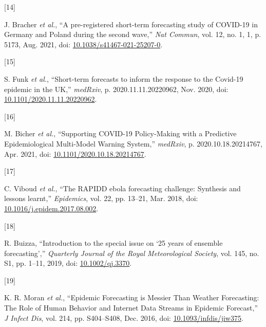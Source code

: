 \documentclass[
]{article}
\newlength{\cslhangindent}
\newlength{\csllabelwidth}
\newlength{\cslentryspacingunit} %
\newenvironment{CSLReferences}[2] %
 {%
  \setlength{\parindent}{0pt}
  \ifodd #1
  \let\oldpar\par
  \def\par{\hangindent=\cslhangindent\oldpar}
  \fi
  \setlength{\parskip}{#2\cslentryspacingunit}
 }%
 {}
\newcommand{\CSLLeftMargin}[1]{\parbox[t]{\csllabelwidth}{#1}}
\newcommand{\CSLRightInline}[1]{\parbox[t]{\linewidth - \csllabelwidth}{#1}\break}
\begin{document}
\begin{CSLReferences}{0}{0}
\leavevmode{}%
\CSLLeftMargin{{[}14{]} }
\CSLRightInline{J. Bracher \emph{et al.}, {``A pre-registered short-term forecasting study of {COVID-19} in {Germany} and {Poland} during the second wave,''} \emph{Nat Commun}, vol. 12, no. 1, 1, p. 5173, Aug. 2021, doi: \href{https://doi.org/10.1038/s41467-021-25207-0}{10.1038/s41467-021-25207-0}.}

\leavevmode{}%
\CSLLeftMargin{{[}15{]} }
\CSLRightInline{S. Funk \emph{et al.}, {``Short-term forecasts to inform the response to the {Covid-19} epidemic in the {UK},''} \emph{medRxiv}, p. 2020.11.11.20220962, Nov. 2020, doi: \href{https://doi.org/10.1101/2020.11.11.20220962}{10.1101/2020.11.11.20220962}.}

\leavevmode{}%
\CSLLeftMargin{{[}16{]} }
\CSLRightInline{M. Bicher \emph{et al.}, {``Supporting {COVID-19 Policy-Making} with a {Predictive Epidemiological Multi-Model Warning System},''} \emph{medRxiv}, p. 2020.10.18.20214767, Apr. 2021, doi: \href{https://doi.org/10.1101/2020.10.18.20214767}{10.1101/2020.10.18.20214767}.}

\leavevmode{}%
\CSLLeftMargin{{[}17{]} }
\CSLRightInline{C. Viboud \emph{et al.}, {``The {RAPIDD} ebola forecasting challenge: {Synthesis} and lessons learnt,''} \emph{Epidemics}, vol. 22, pp. 13--21, Mar. 2018, doi: \href{https://doi.org/10.1016/j.epidem.2017.08.002}{10.1016/j.epidem.2017.08.002}.}

\leavevmode{}%
\CSLLeftMargin{{[}18{]} }
\CSLRightInline{R. Buizza, {``Introduction to the special issue on {`25 years of ensemble forecasting'},''} \emph{Quarterly Journal of the Royal Meteorological Society}, vol. 145, no. S1, pp. 1--11, 2019, doi: \href{https://doi.org/10.1002/qj.3370}{10.1002/qj.3370}.}

\leavevmode{}%
\CSLLeftMargin{{[}19{]} }
\CSLRightInline{K. R. Moran \emph{et al.}, {``Epidemic {Forecasting} is {Messier Than Weather Forecasting}: {The Role} of {Human Behavior} and {Internet Data Streams} in {Epidemic Forecast},''} \emph{J Infect Dis}, vol. 214, pp. S404--S408, Dec. 2016, doi: \href{https://doi.org/10.1093/infdis/jiw375}{10.1093/infdis/jiw375}.}


\end{CSLReferences}
\end{document}
